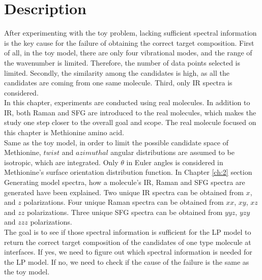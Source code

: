  \label{ch:4}
\section{Description}

After experimenting with the toy problem, lacking sufficient spectral information is the key cause for the failure of obtaining the correct target composition. First of all, in the toy model, there are only four vibrational modes, and the range of the wavenumber is limited. Therefore, the number of data points selected is limited. Secondly, the similarity among the candidates is high, as all the candidates are coming from one same molecule.  Third, only IR spectra is considered. \\

In this chapter, experiments are conducted using real molecules. In addition to IR, both Raman and SFG are introduced to the real molecules, which makes the study one step closer to the overall goal and scope. The real molecule focused on this chapter is Methionine amino acid. \\

Same as the toy model, in order to limit the possible candidate space of Methionine, $twist$ and $azimuthal$ angular distributions are assumed to be isotropic, which are integrated. Only $\theta$ in Euler angles is considered in Methionine's surface orientation distribution function. In Chapter \ref{ch:2} section Generating model spectra, how a molecule's IR, Raman and SFG spectra are generated have been explained. Two unique IR spectra can be obtained from $x$, and $z$ polarizations. Four unique Raman spectra can be obtained from $xx$, $xy$, $xz$ and $zz$ polarizations. Three unique SFG spectra can be obtained from $yyz$, $yzy$ and $zzz$ polarizations.\\

The goal is to see if those spectral information is sufficient for the LP model to return the correct target composition of the candidates of one type molecule at interfaces. If yes, we need to figure out which spectral information is needed for the LP model. If no, we need to check if the cause of the failure is the same as the toy model. \\

